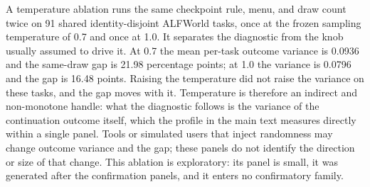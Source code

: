 A temperature ablation runs the same checkpoint rule, menu, and draw count twice on 91 shared identity-disjoint ALFWorld tasks, once at the frozen sampling temperature of 0.7 and once at 1.0. It separates the diagnostic from the knob usually assumed to drive it. At 0.7 the mean per-task outcome variance is 0.0936 and the same-draw gap is 21.98 percentage points; at 1.0 the variance is 0.0796 and the gap is 16.48 points. Raising the temperature did not raise the variance on these tasks, and the gap moves with it. Temperature is therefore an indirect and non-monotone handle: what the diagnostic follows is the variance of the continuation outcome itself, which the profile in the main text measures directly within a single panel. Tools or simulated users that inject randomness may change outcome variance and the gap; these panels do not identify the direction or size of that change. This ablation is exploratory: its panel is small, it was generated after the confirmation panels, and it enters no confirmatory family.
